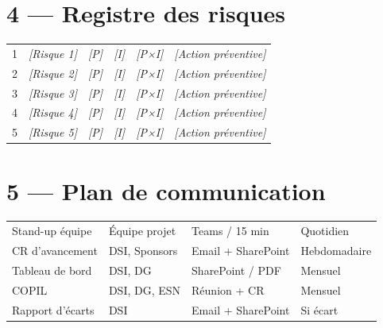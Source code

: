\documentclass[11pt,a4paper,oneside]{report}
\begin{document}
\section*{4 — Registre des risques}

\renewcommand{\arraystretch}{1.3}
\begin{tabularx}{\textwidth}{C{0.5cm} L{4cm} C{1.5cm} C{1.5cm} C{1.5cm} Y}
\toprule
{}\th{\#} &  &  &  &  &  \\
 & \textit{[Risque 1]} & \textit{[P]} & \textit{[I]} & \textit{[P×I]} & \textit{[Action préventive]} \\
2 & \textit{[Risque 2]} & \textit{[P]} & \textit{[I]} & \textit{[P×I]} & \textit{[Action préventive]} \\
3 & \textit{[Risque 3]} & \textit{[P]} & \textit{[I]} & \textit{[P×I]} & \textit{[Action préventive]} \\
4 & \textit{[Risque 4]} & \textit{[P]} & \textit{[I]} & \textit{[P×I]} & \textit{[Action préventive]} \\
5 & \textit{[Risque 5]} & \textit{[P]} & \textit{[I]} & \textit{[P×I]} & \textit{[Action préventive]} \\
\bottomrule
\end{tabularx}

\section*{5 — Plan de communication}

\renewcommand{\arraystretch}{1.3}
\begin{tabularx}{\textwidth}{L{4cm} L{3cm} Y C{2cm}}
\toprule
{} &  &  &  \\
\midrule
Stand-up équipe & Équipe projet & Teams / 15 min & Quotidien \\
CR d'avancement & DSI, Sponsors & Email + SharePoint & Hebdomadaire \\
Tableau de bord & DSI, DG & SharePoint / PDF & Mensuel \\
COPIL & DSI, DG, ESN & Réunion + CR & Mensuel \\
Rapport d'écarts & DSI & Email + SharePoint & Si écart \\
\bottomrule
\end{tabularx}
\end{document}
